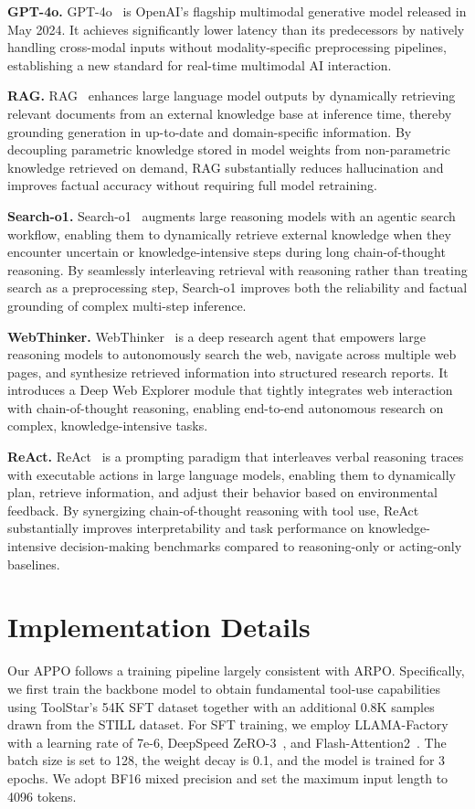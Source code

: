 \documentclass{article}
\begin{document}
\noindent\textbf{GPT-4o.} GPT-4o~\cite{hurst2024gpt} is OpenAI's flagship multimodal generative model released in May 2024. It achieves significantly lower latency than its predecessors by natively handling cross-modal inputs without modality-specific preprocessing pipelines, establishing a new standard for real-time multimodal AI interaction.

\noindent\textbf{RAG.} RAG~\cite{lewis2020retrieval} enhances large language model outputs by dynamically retrieving relevant documents from an external knowledge base at inference time, thereby grounding generation in up-to-date and domain-specific information. By decoupling parametric knowledge stored in model weights from non-parametric knowledge retrieved on demand, RAG substantially reduces hallucination and improves factual accuracy without requiring full model retraining.

\noindent\textbf{Search-o1.} Search-o1~\cite{li2025search} augments large reasoning models with an agentic search workflow, enabling them to dynamically retrieve external knowledge when they encounter uncertain or knowledge-intensive steps during long chain-of-thought reasoning. By seamlessly interleaving retrieval with reasoning rather than treating search as a preprocessing step, Search-o1 improves both the reliability and factual grounding of complex multi-step inference.

\noindent\textbf{WebThinker.} WebThinker~\cite{li2025webthinker} is a deep research agent that empowers large reasoning models to autonomously search the web, navigate across multiple web pages, and synthesize retrieved information into structured research reports. It introduces a Deep Web Explorer module that tightly integrates web interaction with chain-of-thought reasoning, enabling end-to-end autonomous research on complex, knowledge-intensive tasks.

\noindent\textbf{ReAct.} ReAct~\cite{yao2022react} is a prompting paradigm that interleaves verbal reasoning traces with executable actions in large language models, enabling them to dynamically plan, retrieve information, and adjust their behavior based on environmental feedback. By synergizing chain-of-thought reasoning with tool use, ReAct substantially improves interpretability and task performance on knowledge-intensive decision-making benchmarks compared to reasoning-only or acting-only baselines.
 

\section{Implementation Details}\label{appx:c}
Our APPO follows a training pipeline largely consistent with ARPO. Specifically, we first train the backbone model to obtain fundamental tool-use capabilities using ToolStar's 54K SFT dataset together with an additional 0.8K samples drawn from the STILL dataset. For SFT training, we employ LLAMA-Factory~\cite{zheng2024llamafactory} with a learning rate of 7e-6, DeepSpeed ZeRO-3~\cite{rasley2020deepspeed}, and Flash-Attention2~\cite{dao2023flashattention}. The batch size is set to 128, the weight decay is 0.1, and the model is trained for 3 epochs. We adopt BF16 mixed precision and set the maximum input length to 4096 tokens.
\end{document}
